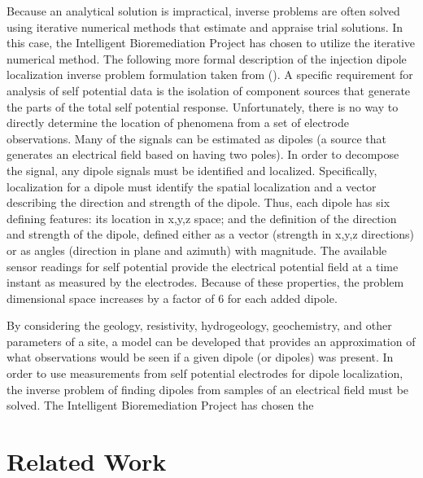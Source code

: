 \documentclass[twocolumn, balance]{article}
\begin{document}
Because an analytical solution is impractical, inverse problems are often solved using iterative numerical methods that estimate and appraise trial solutions.  In this case, the Intelligent Bioremediation Project has chosen to utilize the iterative numerical method.  The following more formal description of the injection dipole localization inverse problem formulation taken from (\cite{hakkarinen2011}).
A specific requirement for analysis of self potential data is the isolation of component sources that generate the parts of the total self potential response. Unfortunately, there is no way to directly determine the location of phenomena from a set of electrode observations. Many of the signals can be estimated as dipoles (a source that generates an electrical field based on having two poles). In order to decompose the signal, any dipole signals must be identified and localized. Specifically, localization for a dipole must identify the spatial localization and a vector describing the direction and strength of the dipole. Thus, each dipole has six defining features: its location in x,y,z space; and the definition of the direction and strength of the dipole, defined either as a vector (strength in x,y,z directions) or as angles (direction in plane and azimuth) with magnitude. The available sensor readings for self potential provide the electrical potential field at a time instant as measured by the electrodes.  Because of these properties, the problem dimensional space increases by a factor of 6 for each added dipole.

By considering the geology, resistivity, hydrogeology, geochemistry, and other parameters of a site, a model can be developed that provides an approximation of what observations would be seen if a given dipole (or dipoles) was present. In order to use measurements from self potential electrodes for dipole localization, the inverse problem of finding dipoles from samples of an electrical field must be solved. The Intelligent Bioremediation Project has chosen the  

\section{Related Work}
\end{document}
